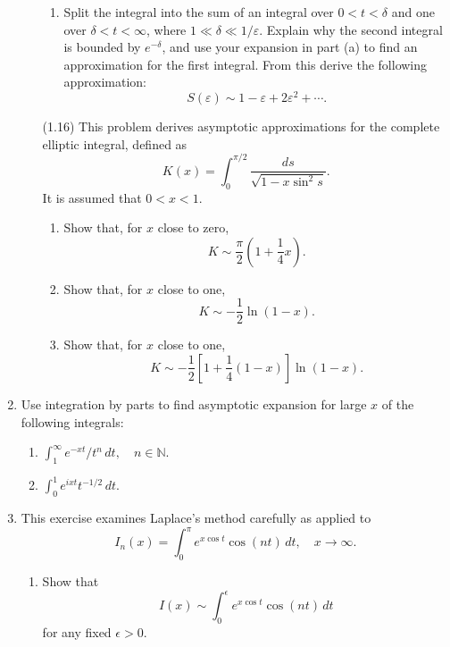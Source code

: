 \documentclass[11pt]{article}
\theoremstyle{problemstyle}
\begin{document}
\begin{enumerate}
\begin{enumerate}
\begin{enumerate}
            \item Split the integral into the sum of an integral over $0
              < t < \delta$ and one over $\delta < t < \infty$, where $1 \ll
              \delta \ll 1/\varepsilon$. Explain why the second integral is
              bounded by $e^{-\delta}$, and use your expansion in part (a) to
              find an approximation for the first integral. From this derive
              the following approximation:
              \[
                S(\varepsilon) \sim 1 - \varepsilon + 2 \varepsilon^2 + \cdots.
              \]
          \end{enumerate}
        \item[(1.16)] This problem derives asymptotic approximations for the
          complete elliptic integral, defined as
          \[
            K(x) = \int_0^{\pi/2} \frac{ds}{\sqrt{1 - x \sin^2 s}}.
          \]
          It is assumed that $0 < x < 1$.
          \begin{enumerate}
              \item Show that, for $x$ close to zero, 
                \[
                  K \sim \frac{\pi}{2} \left(1 + \frac{1}{4}x\right).
                \]
              \item Show that, for $x$ close to one, 
                \[
                  K \sim -\frac{1}{2} \ln(1 - x).
                \]
              \item Show that, for $x$ close to one,
                \[
                  K \sim -\frac{1}{2} \left[ 1 + \frac{1}{4}(1 - x) \right]
                  \ln(1 - x).
                \]
          \end{enumerate}
      \end{enumerate}

    \item Use integration by parts to find asymptotic expansion for large $x$ of
      the following integrals:
    \begin{enumerate}
        \item $\displaystyle \int_1^\infty e^{-xt}/t^n \, dt, \quad n \in
          \mathbb{N}.$
        \item $\displaystyle \int_0^1 e^{ixt} t^{-1/2} \, dt.$
    \end{enumerate}

    \item This exercise examines Laplace’s method carefully as applied to
    \[
    I_n(x) = \int_0^\pi e^{x \cos t} \cos(nt) \, dt, \quad x \to \infty.
    \]
    \begin{enumerate}
        \item Show that
        \[
        I(x) \sim \int_0^\epsilon e^{x \cos t} \cos(nt) \, dt
        \]
        for any fixed $\epsilon > 0$.


\end{enumerate}
\end{enumerate}
\end{document}
